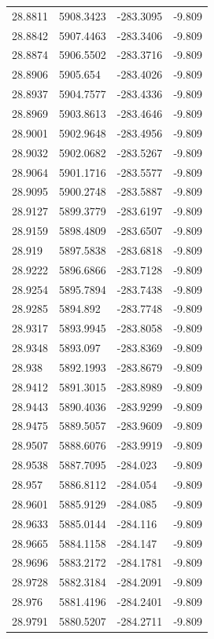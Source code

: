 \begin{table}[H]
\begin{tabular}{llll}
28.8811 & 5908.3423 & -283.3095 & -9.809 \\
28.8842 & 5907.4463 & -283.3406 & -9.809 \\
28.8874 & 5906.5502 & -283.3716 & -9.809 \\
28.8906 & 5905.654 & -283.4026 & -9.809 \\
28.8937 & 5904.7577 & -283.4336 & -9.809 \\
28.8969 & 5903.8613 & -283.4646 & -9.809 \\
28.9001 & 5902.9648 & -283.4956 & -9.809 \\
28.9032 & 5902.0682 & -283.5267 & -9.809 \\
28.9064 & 5901.1716 & -283.5577 & -9.809 \\
28.9095 & 5900.2748 & -283.5887 & -9.809 \\
28.9127 & 5899.3779 & -283.6197 & -9.809 \\
28.9159 & 5898.4809 & -283.6507 & -9.809 \\
28.919 & 5897.5838 & -283.6818 & -9.809 \\
28.9222 & 5896.6866 & -283.7128 & -9.809 \\
28.9254 & 5895.7894 & -283.7438 & -9.809 \\
28.9285 & 5894.892 & -283.7748 & -9.809 \\
28.9317 & 5893.9945 & -283.8058 & -9.809 \\
28.9348 & 5893.097 & -283.8369 & -9.809 \\
28.938 & 5892.1993 & -283.8679 & -9.809 \\
28.9412 & 5891.3015 & -283.8989 & -9.809 \\
28.9443 & 5890.4036 & -283.9299 & -9.809 \\
28.9475 & 5889.5057 & -283.9609 & -9.809 \\
28.9507 & 5888.6076 & -283.9919 & -9.809 \\
28.9538 & 5887.7095 & -284.023 & -9.809 \\
28.957 & 5886.8112 & -284.054 & -9.809 \\
28.9601 & 5885.9129 & -284.085 & -9.809 \\
28.9633 & 5885.0144 & -284.116 & -9.809 \\
28.9665 & 5884.1158 & -284.147 & -9.809 \\
28.9696 & 5883.2172 & -284.1781 & -9.809 \\
28.9728 & 5882.3184 & -284.2091 & -9.809 \\
28.976 & 5881.4196 & -284.2401 & -9.809 \\
28.9791 & 5880.5207 & -284.2711 & -9.809 \\

\end{tabular}
\end{table}
